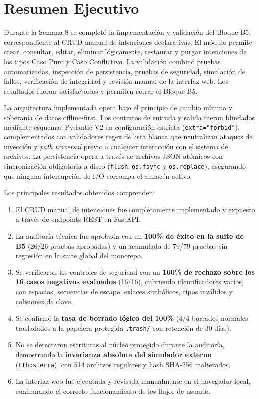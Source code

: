\documentclass[11pt,a4paper]{article}
\begin{document}
\newpage
\tableofcontents
\newpage

\section{Resumen Ejecutivo}

Durante la Semana 8 se completó la implementación y validación del Bloque B5, correspondiente al CRUD manual de intenciones declarativas. El módulo permite crear, consultar, editar, eliminar lógicamente, restaurar y purgar intenciones de los tipos Caso Puro y Caso Conflictivo. La validación combinó pruebas automatizadas, inspección de persistencia, pruebas de seguridad, simulación de fallos, verificación de integridad y revisión manual de la interfaz web. Los resultados fueron satisfactorios y permiten cerrar el Bloque B5.

La arquitectura implementada opera bajo el principio de cambio mínimo y soberanía de datos offline-first. Los contratos de entrada y salida fueron blindados mediante esquemas Pydantic V2 en configuración estricta (\texttt{extra="forbid"}), complementados con validadores regex de lista blanca que neutralizan ataques de inyección y \textit{path traversal} previo a cualquier interacción con el sistema de archivos. La persistencia opera a través de archivos JSON atómicos con sincronización obligatoria a disco (\texttt{flush}, \texttt{os.fsync} y \texttt{os.replace}), asegurando que ninguna interrupción de I/O corrompa el almacén activo.

Los principales resultados obtenidos comprenden:
\begin{enumerate}[itemsep=2pt]
    \item El CRUD manual de intenciones fue completamente implementado y expuesto a través de endpoints REST en FastAPI.
    \item La auditoría técnica fue aprobada con un \textbf{100\% de éxito en la suite de B5} (26/26 pruebas aprobadas) y un acumulado de 79/79 pruebas sin regresión en la suite global del monorepo.
    \item Se verificaron los controles de seguridad con un \textbf{100\% de rechazo sobre los 16 casos negativos evaluados} (16/16), cubriendo identificadores vacíos, con espacios, secuencias de escape, enlaces simbólicos, tipos inválidos y colisiones de clave.
    \item Se confirmó la \textbf{tasa de borrado lógico del 100\%} (4/4 borrados normales trasladados a la papelera protegida \texttt{.trash/} con retención de 30 días).
    \item No se detectaron escrituras al núcleo protegido durante la auditoría, demostrando la \textbf{invarianza absoluta del simulador externo} (\texttt{EthosTerra}), con 514 archivos regulares y hash SHA-256 inalterados.
    \item La interfaz web fue ejecutada y revisada manualmente en el navegador local, confirmando el correcto funcionamiento de los flujos de usuario.
\end{enumerate}
\end{document}
